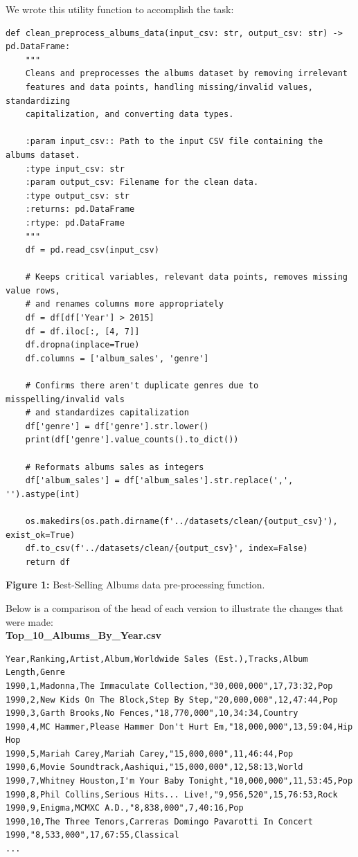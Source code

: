 We wrote this utility function to accomplish the task:

\begin{verbatim}
def clean_preprocess_albums_data(input_csv: str, output_csv: str) -> pd.DataFrame:
    """
    Cleans and preprocesses the albums dataset by removing irrelevant
    features and data points, handling missing/invalid values, standardizing
    capitalization, and converting data types. 

    :param input_csv:: Path to the input CSV file containing the albums dataset.
    :type input_csv: str
    :param output_csv: Filename for the clean data.
    :type output_csv: str
    :returns: pd.DataFrame
    :rtype: pd.DataFrame
    """
    df = pd.read_csv(input_csv)

    # Keeps critical variables, relevant data points, removes missing value rows,
    # and renames columns more appropriately
    df = df[df['Year'] > 2015]
    df = df.iloc[:, [4, 7]]
    df.dropna(inplace=True)
    df.columns = ['album_sales', 'genre']

    # Confirms there aren't duplicate genres due to misspelling/invalid vals
    # and standardizes capitalization
    df['genre'] = df['genre'].str.lower()
    print(df['genre'].value_counts().to_dict())

    # Reformats albums sales as integers
    df['album_sales'] = df['album_sales'].str.replace(',', '').astype(int)

    os.makedirs(os.path.dirname(f'../datasets/clean/{output_csv}'), exist_ok=True)
    df.to_csv(f'../datasets/clean/{output_csv}', index=False)
    return df
\end{verbatim}

\begin{center}
\textbf{Figure 1:} Best-Selling Albums data pre-processing function.
\end{center}

Below is a comparison of the head of each version to illustrate the changes that were made:\\

\noindent\textbf{Top\_10\_Albums\_By\_Year.csv}
\begin{verbatim}
Year,Ranking,Artist,Album,Worldwide Sales (Est.),Tracks,Album Length,Genre
1990,1,Madonna,The Immaculate Collection,"30,000,000",17,73:32,Pop
1990,2,New Kids On The Block,Step By Step,"20,000,000",12,47:44,Pop
1990,3,Garth Brooks,No Fences,"18,770,000",10,34:34,Country
1990,4,MC Hammer,Please Hammer Don't Hurt Em,"18,000,000",13,59:04,Hip Hop
1990,5,Mariah Carey,Mariah Carey,"15,000,000",11,46:44,Pop
1990,6,Movie Soundtrack,Aashiqui,"15,000,000",12,58:13,World
1990,7,Whitney Houston,I'm Your Baby Tonight,"10,000,000",11,53:45,Pop
1990,8,Phil Collins,Serious Hits... Live!,"9,956,520",15,76:53,Rock
1990,9,Enigma,MCMXC A.D.,"8,838,000",7,40:16,Pop
1990,10,The Three Tenors,Carreras Domingo Pavarotti In Concert 1990,"8,533,000",17,67:55,Classical
...
\end{verbatim}

